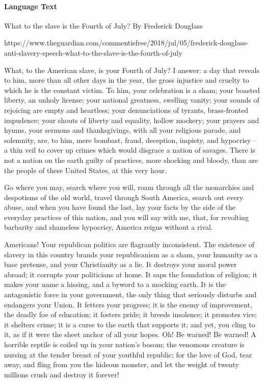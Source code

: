 \documentclass[a4paper,12pt]{article}
\begin{document}
\newpage

\paragraph{Language Text} What to the slave is the Fourth of July? By Frederick Douglass

https://www.theguardian.com/commentisfree/2018/jul/05/frederick-douglass-anti-slavery-speech-what-to-the-slave-is-the-fourth-of-july

\resetlinenumber
\begin{linenumbers}
 What, to the American slave, is your Fourth of July? I answer: a day that reveals to him, more than all other days in the year, the gross injustice and cruelty to which he is the constant victim. To him, your celebration is a sham; your boasted liberty, an unholy license; your national greatness, swelling vanity; your sounds of rejoicing are empty and heartless; your denunciations of tyrants, brass-fronted impudence; your shouts of liberty and equality, hollow mockery; your prayers and hymns, your sermons and thanksgivings, with all your religious parade, and solemnity, are, to him, mere bombast, fraud, deception, impiety, and hypocrisy – a thin veil to cover up crimes which would disgrace a nation of savages. There is not a nation on the earth guilty of practices, more shocking and bloody, than are the people of these United States, at this very hour.

 Go where you may, search where you will, roam through all the monarchies and despotisms of the old world, travel through South America, search out every abuse, and when you have found the last, lay your facts by the side of the everyday practices of this nation, and you will say with me, that, for revolting barbarity and shameless hypocrisy, America reigns without a rival.

 Americans! Your republican politics are flagrantly inconsistent. The existence of slavery in this country brands your republicanism as a sham, your humanity as a base pretense, and your Christianity as a lie. It destroys your moral power abroad; it corrupts your politicians at home. It saps the foundation of religion; it makes your name a hissing, and a byword to a mocking earth. It is the antagonistic force in your government, the only thing that seriously disturbs and endangers your Union. It fetters your progress; it is the enemy of improvement, the deadly foe of education; it fosters pride; it breeds insolence; it promotes vice; it shelters crime; it is a curse to the earth that supports it; and yet, you cling to it, as if it were the sheet anchor of all your hopes. Oh! Be warned! Be warned! A horrible reptile is coiled up in your nation’s bosom; the venomous creature is nursing at the tender breast of your youthful republic; for the love of God, tear away, and fling from you the hideous monster, and let the weight of twenty millions crush and destroy it forever!


\end{linenumbers}
\end{document}

